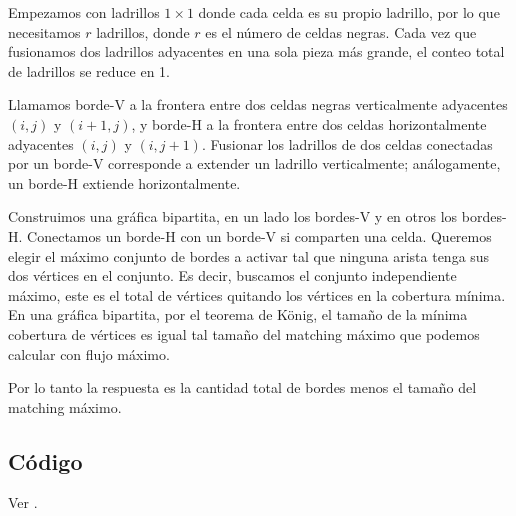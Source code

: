 Empezamos con ladrillos $1\times1$ donde cada celda es su propio ladrillo, por lo que necesitamos $r$ ladrillos, donde $r$ es el número de celdas negras. Cada vez que fusionamos dos ladrillos adyacentes
en una sola pieza más grande, el conteo total de ladrillos se reduce en 1.

Llamamos borde-V a la frontera entre dos celdas negras verticalmente adyacentes $(i,j)$ y $(i+1,j)$, y
borde-H a la frontera entre dos celdas horizontalmente adyacentes $(i,j)$ y $(i,j+1)$. Fusionar los ladrillos de dos celdas conectadas por un borde-V corresponde a extender un ladrillo verticalmente; análogamente, un borde-H extiende
horizontalmente.

Construimos una gráfica bipartita, en un lado los bordes-V y en otros los bordes-H. Conectamos un borde-H con un borde-V si comparten una celda. Queremos elegir el máximo conjunto de bordes a activar tal que ninguna arista tenga sus dos vértices en el conjunto. Es decir, buscamos el conjunto independiente máximo, este es el total de
vértices quitando los vértices en la cobertura mínima. En una gráfica bipartita, por el teorema de König, el tamaño de la mínima cobertura de vértices es igual tal tamaño del matching máximo que podemos calcular con flujo máximo.

Por lo tanto la respuesta es la cantidad total de bordes menos el tamaño del matching máximo.
\subsection*{Código}
Ver .


